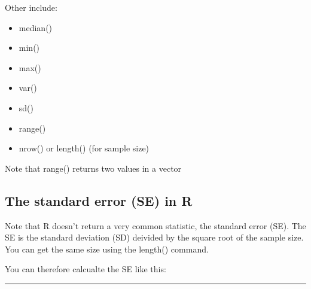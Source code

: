 \documentclass[]{book}
\newenvironment{Shaded}{\begin{snugshade}}{\end{snugshade}}
\newcommand{\KeywordTok}[1]{\textcolor[rgb]{0.13,0.29,0.53}{\textbf{#1}}}
\newcommand{\OperatorTok}[1]{\textcolor[rgb]{0.81,0.36,0.00}{\textbf{#1}}}
\newcommand{\NormalTok}[1]{#1}
\providecommand{\tightlist}{%
  \setlength{\itemsep}{0pt}\setlength{\parskip}{0pt}}
\theoremstyle{definition}
\theoremstyle{definition}
\theoremstyle{definition}
\theoremstyle{remark}
\begin{document}
\begin{Shaded}
\end{Shaded}

Other include:

\begin{itemize}
\tightlist
\item
  median()
\item
  min()
\item
  max()
\item
  var()
\item
  sd()
\item
  range()
\item
  nrow() or length() (for sample size)
\end{itemize}

Note that range() returns two values in a vector

\begin{Shaded}
\end{Shaded}

\subsection{The standard error (SE) in
R}\label{the-standard-error-se-in-r}

Note that R doesn't return a very common statistic, the standard error
(SE). The SE is the standard deviation (SD) deivided by the square root
of the sample size. You can get the same size using the length()
command.

You can therefore calcualte the SE like this:

\begin{Shaded}
\end{Shaded}

\begin{center}\rule{0.5\linewidth}{\linethickness}\end{center}
\end{document}
